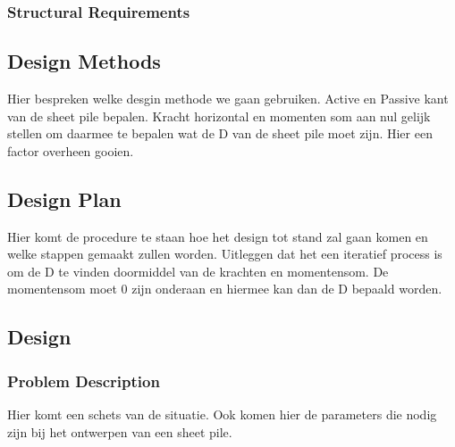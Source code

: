 \subsubsection{Structural Requirements}

\subsection{Design Methods}

Hier bespreken welke desgin methode we gaan gebruiken. Active en Passive kant van de sheet pile bepalen. Kracht horizontal en momenten som aan nul gelijk stellen om daarmee te bepalen wat de D van de sheet pile moet zijn. Hier een factor overheen gooien. 


\subsection{Design Plan}

Hier komt de procedure te staan hoe het design tot stand zal gaan komen en welke stappen gemaakt zullen worden. Uitleggen dat het een iteratief process is om de D te vinden doormiddel van de krachten en momentensom. De momentensom moet 0 zijn onderaan en hiermee kan dan de D bepaald worden. 

\subsection{Design}

\subsubsection{Problem Description}

Hier komt een schets van de situatie. Ook komen hier de parameters die nodig zijn bij het ontwerpen van een sheet pile.


